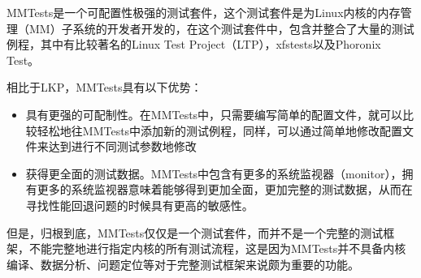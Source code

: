 MMTests是一个可配置性极强的测试套件，这个测试套件是为Linux内核的内存管理（MM）子系统的开发者开发的，在这个测试套件中，包含并整合了大量的测试例程，其中有比较著名的Linux Test Project（LTP），xfstests以及Phoronix Test。

相比于LKP，MMTests具有以下优势：
\begin{itemize}
\item 具有更强的可配制性。在MMTests中，只需要编写简单的配置文件，就可以比较轻松地往MMTests中添加新的测试例程，同样，可以通过简单地修改配置文件来达到进行不同测试参数地修改
\item 获得更全面的测试数据。MMTests中包含有更多的系统监视器（monitor），拥有更多的系统监视器意味着能够得到更加全面，更加完整的测试数据，从而在寻找性能回退问题的时候具有更高的敏感性。
\end{itemize}

但是，归根到底，MMTests仅仅是一个测试套件，而并不是一个完整的测试框架，不能完整地进行指定内核的所有测试流程，这是因为MMTests并不具备内核编译、数据分析、问题定位等对于完整测试框架来说颇为重要的功能。





